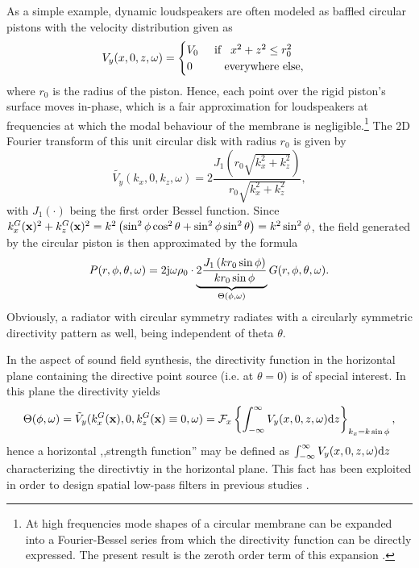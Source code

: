 \vspace{3mm}
As a simple example, dynamic loudspeakers are often modeled as baffled circular pistons with the velocity distribution given as
\begin{equation}
V_y(x,0,z,\omega) =
\begin{cases}
V_0  \hspace{5mm} \text{if} \hspace{3mm} x^2+z^2 \leq r_0^2\\ 
0 \hspace{10mm} \text{everywhere else},
\end{cases}
\end{equation} 
where $r_0$ is the radius of the piston.
Hence, each point over the rigid piston's surface moves in-phase, which is a fair approximation for loudspeakers at frequencies at which the modal behaviour of the membrane is negligible.\footnote{At high frequencies mode shapes of a circular membrane can be expanded into a Fourier-Bessel series from which the directivity function can be directly expressed. 
The present result is the zeroth order term of this expansion \cite{Williams1999}.}
The 2D Fourier transform of this unit circular disk with radius $r_0$ is given by
\begin{equation}
\tilde{V_y}(k_x,0,k_z,\omega) = 2 \frac{J_1\left( r_0 \sqrt{k_x^2+k_z^2} \right)}{r_0 \sqrt{k_x^2+k_z^2}},
\end{equation}
with $J_1(\cdot)$ being the first order Bessel function. 
Since $k^G_x(\vx)^2 + k^G_z(\vx)^2 = k^2 \left( \sin^2 \phi \cos^2 \theta + \sin^2 \phi \sin^2 \theta\right) = k^2 \sin^2 \phi$, the field generated by the circular piston is then approximated by the formula
\begin{equation}
P(r,\phi,\theta,\omega) = 
2 \ti \omega \rho_0 \cdot \underbrace{2
\frac{J_1\left( k r_0 \sin \phi \right)}{k r_0 \sin \phi}
}_{\Theta(\phi,\omega)}
G(r,\phi,\theta,\omega).
\label{Eq:App_Circ_piston}
\end{equation}
Obviously, a radiator with circular symmetry radiates with a circularly symmetric directivity pattern as well, being independent of theta $\theta$.

In the aspect of sound field synthesis, the directivity function in the horizontal plane containing the directive point source (i.e. at $\theta=0$) is of special interest.
In this plane the directivity yields
\begin{equation}
\Theta(\phi,\omega) = \tilde{V}_{y}(k_x^G(\vx),0,k_z^G(\vx) \equiv 0 ,\omega) = \FT[x]{ \int_{-\infty}^{\infty} V_y(x,0,z,\omega) \td z }_{k_x = k \sin \phi},
\end{equation}
hence a horizontal ,,strength function'' may be defined as $\int_{-\infty}^{\infty} V_y(x,0,z,\omega) \td z$ characterizing the directivtiy in the horizontal plane.
This fact has been exploited in order to design spatial low-pass filters in previous studies \cite{Verheijen1997:phd}.